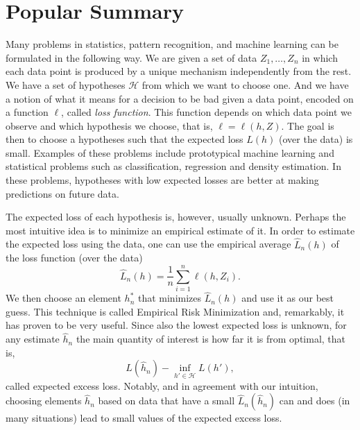 \documentclass{uvamath}
\newcommand*{\calH}{\mathcal{H}}
\newcommand*{\paren}[1]{\left(#1\right)}
\theoremstyle{remark}
\theoremstyle{definition}
\theoremstyle{definition}
\theoremstyle{definition}
\theoremstyle{definition}
\theoremstyle{definition}
\begin{document}
\begin{appendices}


\end{appendices}


\chapter*{Popular Summary}

Many problems in statistics, pattern recognition, and machine learning
can be formulated in the following way. We are given a set of data
$Z_1,\dots,Z_n$ in which each data point is produced by a unique
mechanism independently from the rest. We have a set of hypotheses
$\calH$ from which we want to choose one. And we have a notion of what
it means for a decision to be bad given a data point, encoded on a
function $\ell$, called \textit{loss function}. This function depends
on which data point we observe and which hypothesis we choose, that
is, $\ell = \ell(h,Z)$. The goal is then to choose a hypotheses such
that the expected loss $L(h)$ (over the data) is small. Examples of
these problems include prototypical machine learning and statistical
problems such as classification, regression and density estimation. In
these problems, hypotheses with low expected losses are better at
making predictions on future data.

The expected loss of each hypothesis is, however, usually
unknown. Perhaps the most intuitive idea is to minimize an empirical
estimate of it. In order to estimate the expected loss using the data,
one can use the empirical average $\hat{L}_n(h)$ of the loss function
(over the data)
\begin{equation*}
  \hat{L}_n(h) = \frac{1}{n}\sum_{i=1}^n\ell(h,Z_i).
\end{equation*}
We then choose an element $h^*_n$ that minimizes $\hat{L}_n(h)$ and
use it as our best guess. This technique is called Empirical Risk
Minimization and, remarkably, it has proven to be very useful. Since
also the lowest expected loss is unknown, for any estimate $\hat{h}_n$
the main quantity of interest is how far it is from optimal, that is,
\begin{equation*}
  L(\hat{h}_n) - \inf_{h'\in\calH}L(h'),
\end{equation*}
called expected excess loss. Notably, and in agreement with our
intuition, choosing elements $\hat{h}_n$ based on data that have a
small $\hat{L}_n(\hat{h}_n)$ can and does (in many situations) lead to
small values of the expected excess loss.
\end{document}
